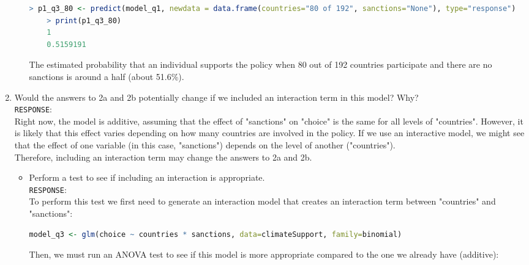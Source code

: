 \documentclass[12pt,letterpaper]{article}
\begin{document}
\begin{enumerate}
\begin{enumerate}
\begin{lstlisting}[language=R]
	> p1_q3_80 <- predict(model_q1, newdata = data.frame(countries="80 of 192", sanctions="None"), type="response")
	> print(p1_q3_80)
	1 
	0.5159191  \end{lstlisting}
\vspace{0.2in}
		
The estimated probability that an individual supports the policy when 80 out of 192 countries participate and there are no sanctions is around a half (about 51.6\%).\\
	
	\end{enumerate}
	\item
	Would the answers to 2a and 2b potentially change if we included an interaction term in this model? Why?\\
	
\texttt{RESPONSE}:\\
	
	Right now, the model is additive, assuming that the effect of "sanctions" on "choice" is the same for all levels of "countries". However, it is likely that this effect varies depending on how many countries are involved in the policy. If we use an interactive model, we might see that the effect of one variable (in this case, "sanctions") depends on the level of another ("countries").\\
	
	Therefore, including an interaction term may change the answers to 2a and 2b.
	
	\begin{itemize}
		\item Perform a test to see if including an interaction is appropriate.\\
		
\texttt{RESPONSE}:\\

To perform this test we first need to generate an interaction model that creates an interaction term between "countries" and "sanctions":\\

\begin{lstlisting}[language=R]
	model_q3 <- glm(choice ~ countries * sanctions, data=climateSupport, family=binomial)
 \end{lstlisting}
\vspace{0.2in}

Then, we must run an ANOVA test to see if this model is more appropriate compared to the one we already have (additive):


\end{itemize}
\end{enumerate}
\end{document}
